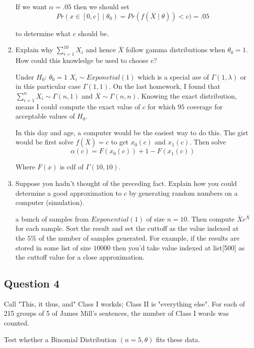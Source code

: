 \documentclass{tufte-book}
\theoremstyle{mytheoremstyle}
\theoremstyle{mylemstyle}
\theoremstyle{mydefstyle}
\begin{document}
\begin{enumerate}
If we want $\alpha=.05$ then we should set
\[ Pr(x \in [0, c] \mid \theta_0) = Pr(f(\overline{X} \mid \theta)) < c) = .05 \]

to determine what $c$ should be.

\item Explain why $\sum_{i=1}^{10} X_i$ and hence $\overline{X}$ follow gamma distributions when $\theta_0=1$.  How could this knowledge be used to choose c?

Under $H_0$: $\theta_0=1$ $X_i \sim Exponetial(1)$ which is a special ase of $\Gamma(1,\lambda)$ or in this particular case $\Gamma(1,1)$.  On the last homework, I found that $\sum_{i=1}^n X_i \sim \Gamma(n,1)$ and $\overline{X} \sim \Gamma(n,n)$.  Knowing the exact distribution, means I could compute the exact value of $c$ for which $95$ coverage for acceptable values of $H_0$.

In this day and age, a computer would be the easiest way to do this.  The gist would be first solve $f(\overline{X})=c$ to get $x_0(c)$ and $x_1(c)$.  Then solve
\[ \alpha(c) = F(x_0(c)) + 1-F(x_1(c)) \]

Where $F(x)$ is cdf of $\Gamma(10,10)$.

\item Suppose you hadn't thought of the preceding fact.  Explain how you could determine a good approximation to $c$ by generating random numbers on a computer (simulation).

 a bunch of samples from $Exponential(1)$ of size $n=10$.  Then compute $\overline{X}e^{\overline{X}}$ for each sample. Sort the result and set the cuttoff as the value indexed at the $5\%$ of the number of samples generated.  For example, if the results are stored in some list of size $10000$ then you'd take value indexed at list[500] as the cuttoff value for a close approximation.
\end{enumerate}

\subsection{Question 4}

Call "This, it thus, and" Class I workds; Class II is "everything else".   For each of 215 groups of 5 of James Mill's sentences, the number of Class I words was counted.

Test whether a Binomial Distribution $(n=5, \theta)$ fits these data.
\end{document}
